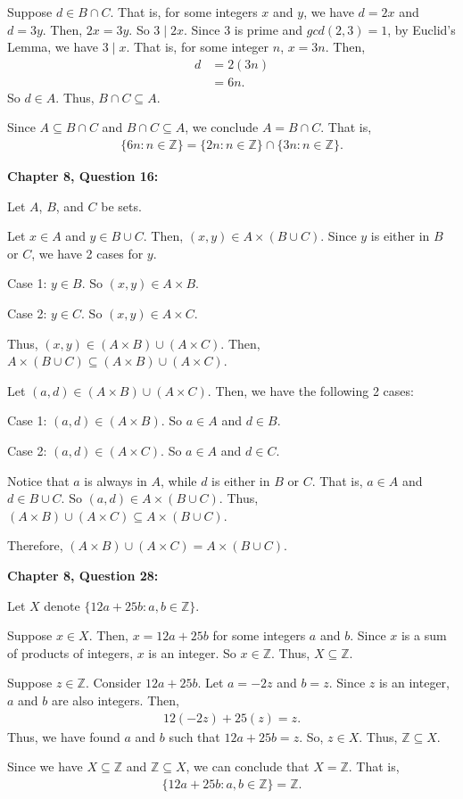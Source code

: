 \documentclass[12pt]{article}
\begin{document}
Suppose $d \in B \cap C$.
That is, for some integers $x$ and $y$, we have $d = 2x$ and $d = 3y$.
Then, $2x = 3y$. So $3 \mid 2x$.
Since 3 is prime and $gcd(2, 3) = 1$, by Euclid's Lemma, we have $ 3 \mid x$.
That is, for some integer $n$, $x = 3n$.
Then,
\begin{align*}
    d & = 2(3n) \\
      & = 6n.
\end{align*}
So $d \in A$.
Thus, $B \cap C \subseteq A$.

Since $A \subseteq B \cap C$ and $B \cap C \subseteq A$, we conclude $A = B \cap C$. That is,
\begin{align*}
    \{6n : n \in{\mathbb{Z}} \} = \{ 2n : n \in{\mathbb{Z}} \} \cap \{ 3n : n \in{\mathbb{Z}} \}.
\end{align*}

\noindent \textbf{Chapter 8, Question 16:}

Let $A$, $B$, and $C$ be sets.

Let $x \in A$ and $y \in B \cup C$.
Then, $(x,y) \in A \times (B \cup C)$.
Since $y$ is either in $B$ or $C$, we have 2 cases for $y$.

\noindent{}Case 1: $y \in B$.
So $(x,y) \in A \times B$.

\noindent{}Case 2: $y \in C$.
So $(x,y) \in A \times C$.

\noindent{}Thus, $(x,y) \in (A \times B) \cup (A \times C)$.
Then, $A \times (B \cup C) \subseteq (A \times B) \cup (A \times C)$.

Let $(a, d) \in (A \times B) \cup (A \times C)$.
Then, we have the following 2 cases:

\noindent{}Case 1: $(a, d) \in (A \times B)$.
So $a \in A$ and $d \in B$.

\noindent{}Case 2: $(a, d) \in (A \times C)$.
So $a \in A$ and $d \in C$.

\noindent{}Notice that $a$ is always in $A$, while $d$ is either in $B$ or $C$.
That is, $a \in A$ and $d \in B \cup C$.
So $(a, d) \in A \times (B \cup C)$.
Thus, $(A \times B) \cup (A \times C) \subseteq A \times (B \cup C)$.

Therefore, $(A \times B) \cup (A \times C) = A \times (B \cup C)$.

\noindent \textbf{Chapter 8, Question 28:}

Let $X$ denote $\{12a + 25b: a,b \in \mathbb{Z}\}$.

Suppose $x \in X$.
Then, $x = 12a + 25b$ for some integers $a$ and $b$.
Since $x$ is a sum of products of integers, $x$ is an integer.
So $x \in \mathbb{Z}$.
Thus, $X \subseteq \mathbb{Z}$.

Suppose $z \in \mathbb{Z}$.
Consider $12a + 25b$.
Let $a = -2z$ and $b = z$.
Since $z$ is an integer, $a$ and $b$ are also integers.
Then,
\begin{align*}
    12(-2z) + 25(z) = z.
\end{align*}
Thus, we have found $a$ and $b$ such that $12a + 25b = z$.
So, $z \in X$.
Thus, $\mathbb{Z} \subseteq X$.

Since we have $X \subseteq \mathbb{Z}$ and $\mathbb{Z} \subseteq X$, we can conclude that $X = \mathbb{Z}$.
That is,
\begin{align*}
    \{12a + 25b: a,b \in \mathbb{Z}\} = \mathbb{Z}.
\end{align*}
\end{document}
